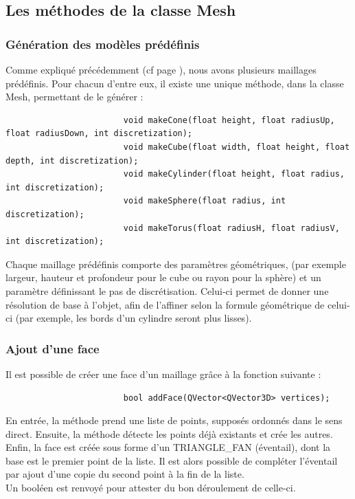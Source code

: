 \documentclass[a4paper]{memoir}
\begin{document}
			\subsection{Les méthodes de la classe Mesh}
				\label{mesh-dev}
				\subsubsection{Génération des modèles prédéfinis}
					Comme expliqué précédemment (cf page \pageref{model-cdc}), nous avons plusieurs maillages prédéfinis. Pour chacun d'entre eux, 
					il existe une unique méthode, dans la classe Mesh, permettant de le générer :
					\begin{verbatim}
						void makeCone(float height, float radiusUp, float radiusDown, int discretization);
						void makeCube(float width, float height, float depth, int discretization);
						void makeCylinder(float height, float radius, int discretization);
						void makeSphere(float radius, int discretization);
						void makeTorus(float radiusH, float radiusV, int discretization);
					\end{verbatim}
					Chaque maillage prédéfinis comporte des paramètres géométriques, (par exemple largeur, hauteur et profondeur pour le cube ou rayon pour 
					la sphère) et un paramètre définissant le pas de discrétisation. Celui-ci permet de donner une résolution de base à l'objet, afin de 
					l'affiner selon la formule géométrique de celui-ci (par exemple, les bords d'un cylindre seront plus lisses).
					
				\subsubsection{Ajout d'une face}
					Il est possible de créer une face d'un maillage grâce à la fonction suivante :
					\begin{verbatim}
						bool addFace(QVector<QVector3D> vertices);
					\end{verbatim}
					En entrée, la méthode prend une liste de points, supposés ordonnés dans le sens direct. Ensuite, la méthode détecte les points déjà 
					existants et crée les autres. Enfin, la face est créée sous forme d'un TRIANGLE\_FAN (éventail), dont la base est le premier point 
					de la liste. Il est alors possible de compléter l'éventail par ajout d'une copie du second point à la fin de la liste.\\
					Un booléen est renvoyé pour attester du bon déroulement de celle-ci.
					
\end{document}

